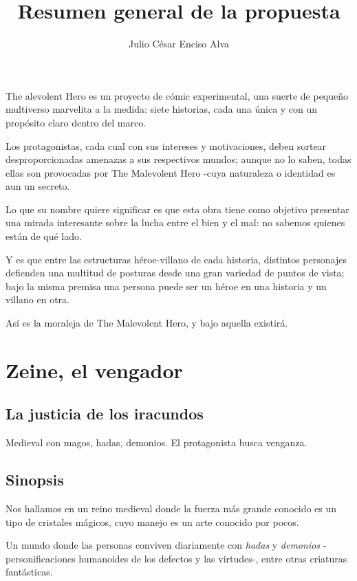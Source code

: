 \documentclass[letterpaper,12pt]{article}
\title{Resumen general de la propuesta}
\author{Julio César Enciso Alva}
\begin{document}
	
	\maketitle
	
	The alevolent Hero es un proyecto de cómic experimental, una suerte de pequeño
	multiverso marvelita a la medida: siete historias, cada una única y con un propósito claro
	dentro del marco.
	
	Los protagonistas, cada cual con sus intereses y motivaciones, deben sortear desproporcionadas
	amenazas a sus
	respectivos mundos; aunque no lo saben, todas ellas son provocadas por The Malevolent Hero
	-cuya naturaleza o identidad es aun un secreto.
	
	Lo que su nombre quiere significar es que esta obra tiene como objetivo presentar una 
	mirada interesante sobre la lucha entre el bien y el mal: no sabemos quienes están de qué lado.
	
	Y es que entre las estructuras héroe-villano de cada historia, distintos personajes defienden
	una multitud de posturas desde una gran variedad de puntos de vista; bajo la misma 
	premisa una persona puede ser un héroe en una historia y un villano en otra.
	
	Así es la moraleja de The Malevolent Hero, y bajo aquella existirá.
	
	\newpage
	
	\section*{Zeine, el vengador}
	
	\subsection*{La justicia de los iracundos}
	
	Medieval con magos, hadas, demonios. El protagonista busca venganza.
	
	\subsection*{Sinopsis}
	
	Nos hallamos en un reino medieval donde la fuerza más grande conocido es un tipo de cristales mágicos, cuyo
	manejo es un arte conocido por pocos.
	
	Un mundo donde las personas conviven diariamente con \textit{hadas} y \textit{demonios}
	-personificaciones humanoides de los defectos y las virtudes-, entre otras criaturas fantásticas. 
	
\end{document}
